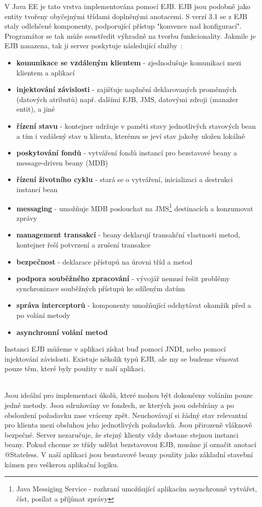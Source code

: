 \documentclass[122pt,oneside]{fithesis}
\begin{document}
V Java EE je tato vrstva implementována pomocí EJB. EJB jsou podobně jako entity tvořeny obyčejnými třídami doplněnými anotacemi. S verzí 3.1 se z EJB staly odlehčené komponenty, podporující přístup "konvence nad konfigurací". Programátor se tak může soustředit výhradně na tvorbu funkcionality. Jakmile je EJB nasazena, tak ji server poskytuje následující služby~\cite{wikiEJB}:

\begin{itemize}
  \item {\bf komunikace se vzdáleným klientem} - zjednodušuje komunikaci mezi klientem a aplikací
  \item {\bf injektování závislosti} - zajišťuje naplnění deklarovaných proměnných (datových atributů) např. dalšími EJB, JMS, datovými zdroji (manažer entit), a jiné
  \item {\bf řízení stavu} - kontejner udržuje v paměti stavy jednotlivých stavových bean a tím i vzdálený stav u klienta, kterému se jeví stav jakoby uložen lokálně
  \item {\bf poskytování fondů} - vytváření fondů instancí pro bezstavové beany a message-driven beany (MDB)
  \item {\bf řízení životního cyklu} - stará se o vytváření, inicializaci a destrukci instancí bean
  \item {\bf messaging} - umožňuje MDB poslouchat na JMS\footnote[1]{Java Messiging Service - rozhraní umožňující aplikacím asynchronně vytvářet, číst, posílat a příjímat zprávy} destinacích a konzumovat zprávy
  \item {\bf management transakcí} - beany deklarují transakční vlastnosti metod, kontejner řeší potvrzení a zrušení transakce
  \item {\bf bezpečnost} - deklarace přístupů na úrovni tříd a metod
  \item {\bf podpora souběžného zpracování} - vývojář nemusí řešit problémy synchronizace souběžných přístupů ke sdíleným datům
  \item {\bf správa interceptorů} - komponenty umožňující odchytávat okamžik před a po volání metody
  \item {\bf asynchronní volání metod} 
\end{itemize}

Instanci EJB můžeme v aplikaci získat buď pomocí JNDI, nebo pomocí injektování závislosti.
Existuje několik typů EJB, ale my se budeme věnovat pouze těm, které byly použity v naší aplikaci.

\vspace{5 mm}
\\\indent Jsou ideální pro implementaci úkolů, které mohou být dokončeny voláním pouze jedné metody. Jsou sdružovány ve fondech, ze kterých jsou odebírány a po obsloužení požadavku zase vráceny zpět. Neuchovávají si žádný stav relevantní pro klienta mezi obsluhou jeho jednotlivých požadavků. Jsou přirozeně vláknově bezpečné. Server nezaručuje, že stejný klienty vždy dostane stejnou instanci beany. Pokud chceme ze třídy udělat bezstavovou EJB, musíme jí označit anotací @Stateless. V naší aplikaci jsou bezstavové beany použity jako základní stavební kámen pro veškerou aplikační logiku.
\end{document}
